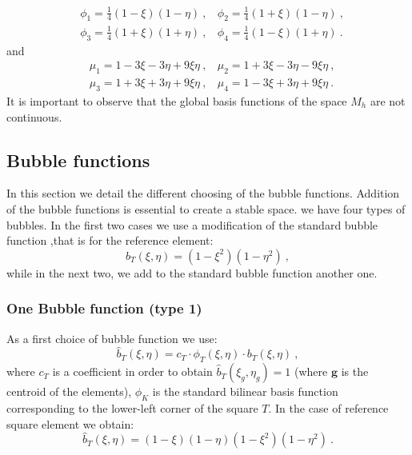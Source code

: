 \documentclass[preprint,12pt,authoryear]{elsarticle}
\begin{document}
%
\begin{equation}
\begin{split}
&\phi_{1}=\frac{1}{4}(1-\xi)(1-\eta) \:, \:\:\:\: \phi_{2}=\frac{1}{4}(1+\xi)(1-\eta) \:,\\
&\phi_{3}=\frac{1}{4}(1+\xi)(1+\eta) \:, \:\:\:\: \phi_{4}=\frac{1}{4}(1-\xi)(1+\eta) \:.
\end{split}
\end{equation}   
and
\begin{equation}
\begin{split}
&\mu_{1} = 1 - 3\xi - 3\eta + 9\xi\eta \:, \:\:\:\: 
\mu_{2} = 1 + 3\xi - 3\eta - 9\xi\eta \:,\\
&\mu_{3} = 1 + 3\xi + 3\eta + 9\xi\eta \:, \:\:\:\: 
\mu_{4} = 1 - 3\xi + 3\eta + 9\xi\eta \:.
\end{split}
\end{equation}
It is important to observe that the global basis functions of the space $M_{h}$ are not continuous.
   
\subsection{Bubble functions}
In this section we detail the different choosing of the bubble functions. Addition of the bubble functions is essential to create a stable space. we have four types of bubbles.
In the first two cases we use a modification of the standard bubble function ,that is for the reference element:
\begin{equation}\label{eq:standard_bubble_fun}
b_{T}(\xi,\eta) = (1-\xi^{2})(1-\eta^{2})\:,
\end{equation}
while in the next two, we add to the standard bubble function another one.
\subsubsection{One Bubble function (type 1)}
As a first choice of bubble function we use:
\begin{equation}\label{eq:bubble_1}
\hat{b}_{T}(\xi,\eta) = c_{T}\cdot\phi_{T}(\xi,\eta)\cdot b_{T}(\xi,\eta)\:, 
\end{equation}
where $c_{T}$ is a coefficient in order to obtain $\hat{b}_{T}(\xi_{g},\eta_{g}) = 1$ (where $\bm{g}$ is the centroid of the elements), $\phi_{K}$ is the standard bilinear basis function corresponding to the lower-left corner of the square $T$.
In the case of reference square element we obtain:
\begin{equation} \label{eq:bubble_1_ref}
\hat{b}_{T}(\xi,\eta) = (1-\xi)(1-\eta)(1-\xi^{2})(1-\eta^{2})\:.
\end{equation}
\end{document}
